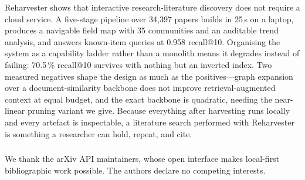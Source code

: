 \documentclass[runningheads]{llncs}
\begin{document}
Reharvester shows that interactive research-literature discovery does not require a
cloud service. A five-stage pipeline over 34{,}397 papers builds in 25\,s on a laptop,
produces a navigable field map with 35 communities and an auditable trend analysis, and
answers known-item queries at 0.958 recall@10. Organising the system as a capability
ladder rather than a monolith means it degrades instead of failing: 70.5\,\% recall@10
survives with nothing but an inverted index. Two measured negatives shape the design as
much as the positives---graph expansion over a document-similarity backbone does not
improve retrieval-augmented context at equal budget, and the exact backbone is
quadratic, needing the near-linear pruning variant we give. Because everything after
harvesting runs locally and every artefact is inspectable, a literature search performed
with Reharvester is something a researcher can hold, repeat, and cite.

\begin{credits}
\subsubsection{\ackname}
We thank the arXiv API maintainers, whose open interface makes local-first bibliographic
work possible. The authors declare no competing interests.
\end{credits}

\begingroup
\small
\setlength{\itemsep}{0pt}
\providecommand{\doi}[1]{}\renewcommand{\doi}[1]{}


\endgroup
\end{document}

